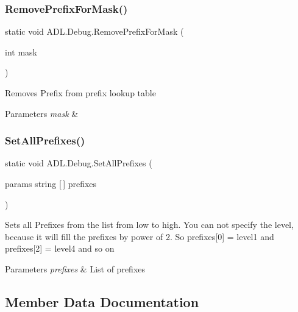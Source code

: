 \subsubsection{\texorpdfstring{Remove\+Prefix\+For\+Mask()}{RemovePrefixForMask()}}
{\footnotesize\ttfamily static void A\+D\+L.\+Debug.\+Remove\+Prefix\+For\+Mask (\begin{DoxyParamCaption}\item[{int}]{mask }\end{DoxyParamCaption})\hspace{0.3cm}{\ttfamily [static]}}



Removes Prefix from prefix lookup table 


\begin{DoxyParams}{Parameters}
{\em mask} & \\
\hline
\end{DoxyParams}
\mbox{\label{class_a_d_l_1_1_debug_aeee052b6bc6759222ce6ed32dd9763a1}} 
\subsubsection{\texorpdfstring{Set\+All\+Prefixes()}{SetAllPrefixes()}}
{\footnotesize\ttfamily static void A\+D\+L.\+Debug.\+Set\+All\+Prefixes (\begin{DoxyParamCaption}\item[{params string \mbox{[}$\,$\mbox{]}}]{prefixes }\end{DoxyParamCaption})\hspace{0.3cm}{\ttfamily [static]}}



Sets all Prefixes from the list from low to high. You can not specify the level, because it will fill the prefixes by power of 2. So prefixes\mbox{[}0\mbox{]} = level1 and prefixes\mbox{[}2\mbox{]} = level4 and so on 


\begin{DoxyParams}{Parameters}
{\em prefixes} & List of prefixes\\
\hline
\end{DoxyParams}


\subsection{Member Data Documentation}
\mbox{\label{class_a_d_l_1_1_debug_ae158a8228eacba82054cb7b340153fe9}} 
